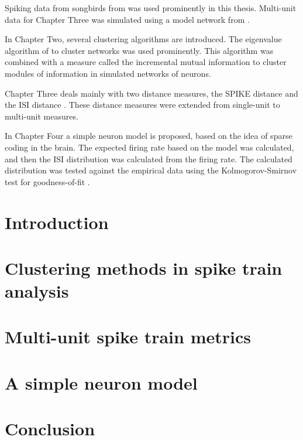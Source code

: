 \documentclass[twoside,12pt]{report}
\begin{document}
Spiking data from songbirds from \citep{NarayanEtAl2006b} was used prominently in this thesis.  Multi-unit data for Chapter Three was simulated using a model network from \citep{HoughtonSen2008a}.

In Chapter Two, several clustering algorithms are introduced.  The eigenvalue algorithm of \citep{Newman2006b} to cluster networks was used prominently. This algorithm was combined with a measure called the incremental mutual information \citep{SinghLesica2010a} to cluster modules of information in simulated networks of neurons.

Chapter Three deals mainly with two distance measures, the SPIKE distance \citep{KreuzEtAl2012a} and the ISI distance \citep{KreuzEtAl2007a}.  These distance measures were extended from single-unit to multi-unit measures.

In Chapter Four a simple neuron model is proposed, based on the idea of sparse coding in the brain.  The expected firing rate based on the model was calculated, and then the ISI distribution was calculated from the firing rate.  The calculated distribution was tested against the empirical data using the Kolmogorov-Smirnov test for goodness-of-fit \citep{Massey1951a}.
\cleardoublepage
\tableofcontents
\cleardoublepage

\chapter{Introduction}

\cleardoublepage
\chapter{Clustering methods in spike train analysis}

\cleardoublepage
\chapter{Multi-unit spike train metrics}

\cleardoublepage
\chapter{A simple neuron model}

\cleardoublepage
\chapter{Conclusion}

\cleardoublepage

\end{document}
